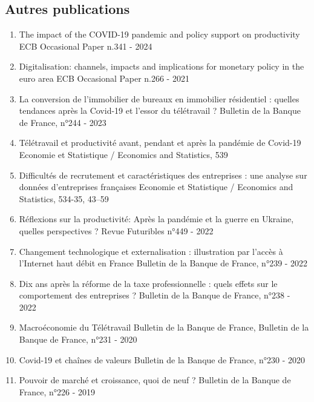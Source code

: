 \documentclass[12pt]{article}
\begin{document}
\subsection*{Autres publications }
\begin{footnotesize}
    \begin{enumerate}
\item The impact of the COVID-19 pandemic and policy support on productivity  ECB Occasional Paper n.341 - 2024

\item Digitalisation: channels, impacts and implications for monetary policy in the euro area  ECB Occasional Paper n.266 - 2021

\item La conversion de l'immobilier de bureaux en immobilier résidentiel : quelles tendances après la Covid-19 et l'essor du télétravail ? Bulletin de la Banque de France, n°244 - 2023

\item Télétravail et productivité avant, pendant et après la pandémie de Covid-19  Economie et Statistique / Economics and Statistics, 539 

\item Difficultés de recrutement et caractéristiques des entreprises : une analyse sur données d'entreprises françaises Economie et Statistique / Economics and Statistics, 534-35, 43–59 

\item Réflexions sur la productivité: Après la pandémie et la guerre en Ukraine, quelles perspectives ? Revue Futuribles n°449 - 2022

\item Changement technologique et externalisation : illustration par l'accès à l'Internet haut débit en France Bulletin de la Banque de France, n°239 - 2022 

\item Dix ans après la réforme de la taxe professionnelle : quels effets sur le comportement des entreprises ? Bulletin de la Banque de France, n°238 - 2022 

\item Macroéconomie du Télétravail Bulletin de la Banque de France, Bulletin de la Banque de France, n°231 - 2020 

\item Covid-19 et chaînes de valeurs Bulletin de la Banque de France, n°230 - 2020 

\item Pouvoir de marché et croissance, quoi de neuf ? Bulletin de la Banque de France, n°226 - 2019 


\end{enumerate}
\end{footnotesize}
\end{document}
